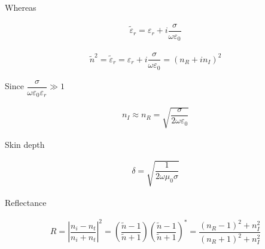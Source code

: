Whereas

\begin{equation*}
  \begin{aligned}
    \tilde{\varepsilon}_r = \varepsilon_r + i \dfrac{\sigma}{\omega \varepsilon_0} 
  \end{aligned}
\end{equation*}

\begin{equation*}
  \begin{aligned}
    \tilde{n}^2 = \tilde{\varepsilon}_r = \varepsilon_r + i \dfrac{\sigma}{\omega \varepsilon_0} = \left( n_R + i n_I \right)^2
  \end{aligned}
\end{equation*}

Since $\dfrac{\sigma}{\omega \varepsilon_0 \varepsilon_r} \gg 1 $

\begin{equation*}
  \begin{aligned}
    n_I \approx n_R = \sqrt{\dfrac{\sigma}{2 \omega \varepsilon_0} }
  \end{aligned}
\end{equation*}

Skin depth

\begin{equation*}
  \begin{aligned}
    \delta = \sqrt{\dfrac{1}{2 \omega \mu_0 \sigma} }
  \end{aligned}
\end{equation*}

Reflectance

\begin{equation*}
  \begin{aligned}
    R = \left| \dfrac{n_i - n_t}{n_i + n_t}  \right|^2 = \left( \dfrac{\tilde{n} - 1}{\tilde{n} + 1}  \right) \left( \dfrac{\tilde{n} - 1}{\tilde{n} + 1}  \right)^{*} = \dfrac{\left( n_R - 1 \right)^2 + n_I^2}{\left( n_R + 1 \right)^2 + n_I^2} 
  \end{aligned}
\end{equation*}

